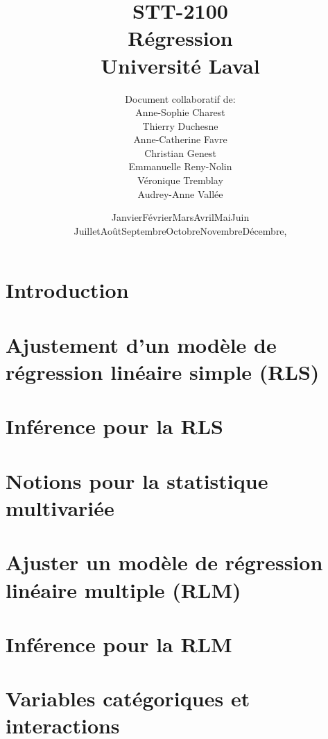 \documentclass[11pt,oneside,openany]{book}
\title{STT-2100 \\ Régression \\ Université Laval \\[3cm]}
\author{Document collaboratif de: \\
Anne-Sophie Charest \\
Thierry Duchesne \\
Anne-Catherine Favre \\
Christian Genest \\
Emmanuelle Reny-Nolin \\
Véronique Tremblay \\
Audrey-Anne Vallée \\[3cm]}
\date{\ifcase\month\or
  Janvier\or Février\or Mars\or Avril\or Mai\or Juin\or
  Juillet\or Août\or Septembre\or Octobre\or Novembre\or Décembre\fi, \the\year}
\begin{document}
\maketitle

\dominitoc \tableofcontents
\dominilof \listoffigures

\chapter{Introduction} \label{sec:intro}
\minitoc \mtcskip \minilof


\chapter{Ajustement d'un modèle de régression linéaire simple (RLS)} \label{sec:AjusterRLS}
\minitoc \mtcskip \minilof


\chapter{Inférence pour la RLS} \label{sec:InferenceRLS}
\minitoc \mtcskip \minilof


\chapter{Notions pour la statistique multivariée} \label{sec:NotionsMultivarie}
\minitoc \mtcskip \minilof


\chapter{Ajuster un modèle de régression linéaire multiple (RLM)} \label{sec:AjusterRLM}
\minitoc \mtcskip \minilof


\chapter{Inférence pour la RLM} 
\label{sec:InferenceRLM}
\minitoc \mtcskip \minilof





\chapter{Variables catégoriques et interactions}\label{sec:CategoriquesInteractions}
\minitoc \mtcskip \minilof

\end{document}
